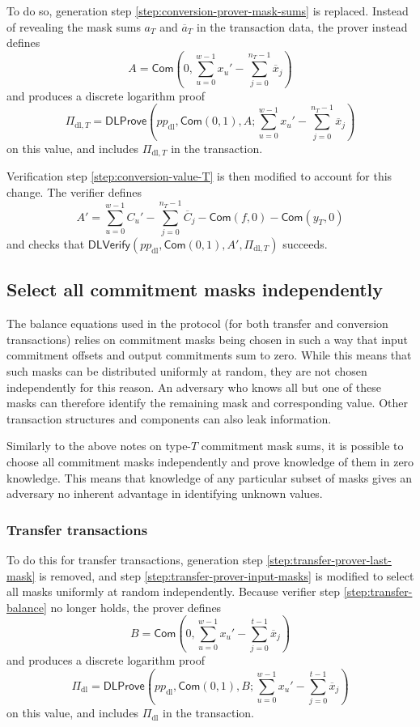 \documentclass{article}
\newcommand{\func}[1]{\mathsf{#1}}
\newcommand{\com}{\func{Com}}
\begin{document}
To do so, generation step \ref{step:conversion-prover-mask-sums} is replaced.
Instead of revealing the mask sums $a_T$ and $\overline{a}_T$ in the transaction data, the prover instead defines
$$A = \com\left( 0, \sum_{u=0}^{w-1} x_u' - \sum_{j=0}^{n_T-1} \overline{x}_j \right)$$
and produces a discrete logarithm proof
$$\Pi_{\text{dl},T} = \func{DLProve}\left( pp_{\text{dl}}, \com(0,1), A ; \sum_{u=0}^{w-1} x_u' - \sum_{j=0}^{n_T-1} \overline{x}_j \right)$$
on this value, and includes $\Pi_{\text{dl},T}$ in the transaction.

Verification step \ref{step:conversion-value-T} is then modified to account for this change.
The verifier defines
$$A' = \sum_{u=0}^{w-1} C_u' - \sum_{j=0}^{n_T-1} \overline{C}_j - \com(f,0) - \com(y_T,0)$$
and checks that $\func{DLVerify}(pp_{\text{dl}}, \com(0,1), A', \Pi_{\text{dl},T})$ succeeds.


\subsection{Select all commitment masks independently}
\label{rec:zk-masks}

The balance equations used in the protocol (for both transfer and conversion transactions) relies on commitment masks being chosen in such a way that input commitment offsets and output commitments sum to zero.
While this means that such masks can be distributed uniformly at random, they are not chosen independently for this reason.
An adversary who knows all but one of these masks can therefore identify the remaining mask and corresponding value.
Other transaction structures and components can also leak information.

Similarly to the above notes on type-$T$ commitment mask sums, it is possible to choose all commitment masks independently and prove knowledge of them in zero knowledge.
This means that knowledge of any particular subset of masks gives an adversary no inherent advantage in identifying unknown values.

\subsubsection{Transfer transactions}

To do this for transfer transactions, generation step \ref{step:transfer-prover-last-mask} is removed, and step \ref{step:transfer-prover-input-masks} is modified to select all masks uniformly at random independently.
Because verifier step \ref{step:transfer-balance} no longer holds, the prover defines
$$B = \com\left( 0, \sum_{u=0}^{w-1} x_u' - \sum_{j=0}^{t-1} \overline{x}_j \right)$$
and produces a discrete logarithm proof
$$\Pi_{\text{dl}} = \func{DLProve}\left( pp_{\text{dl}}, \com(0,1), B ; \sum_{u=0}^{w-1} x_u' - \sum_{j=0}^{t-1} \overline{x}_j \right)$$
on this value, and includes $\Pi_{\text{dl}}$ in the transaction.
\end{document}
